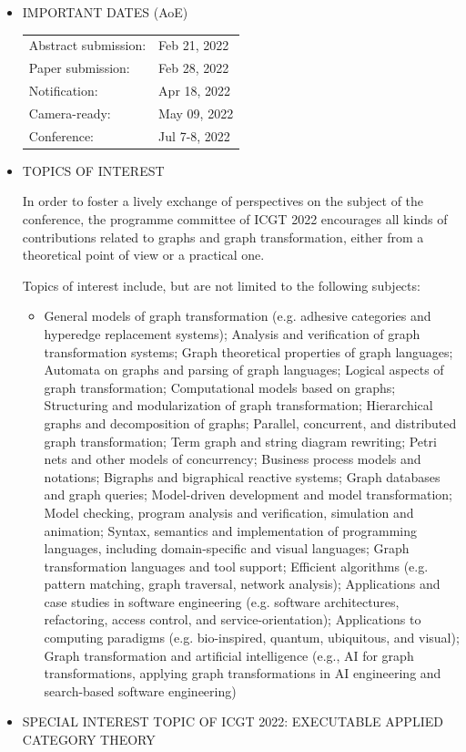 \documentclass[prodmode,acmtecs]{acmsmall} %
\begin{document}
\begin{itemize}
\item  IMPORTANT DATES (AoE) 
 
\begin{tabulary}{\linewidth}{LL}Abstract submission:  & Feb 21, 2022 \\
Paper submission:  & Feb 28, 2022 \\
Notification:  & Apr 18, 2022 \\
Camera-ready:  & May 09, 2022 \\
Conference:  & Jul 7-8, 2022 \\
\end{tabulary}
 
\item  TOPICS OF INTEREST 
 
  In order to foster a lively exchange of perspectives on the subject of the conference, the programme committee of ICGT 2022 encourages all kinds of contributions related to graphs and graph transformation, either from a theoretical point of view or a practical one. 
 
  Topics of interest include, but are not limited to the following subjects: 
 
\begin{itemize}\item  General models of graph transformation (e.g. adhesive categories and hyperedge replacement systems); Analysis and verification of graph transformation systems; Graph theoretical properties of graph languages; Automata on graphs and parsing of graph languages; Logical aspects of graph transformation; Computational models based on graphs; Structuring and modularization of graph transformation; Hierarchical graphs and decomposition of graphs; Parallel, concurrent, and distributed graph transformation; Term graph and string diagram rewriting; Petri nets and other models of concurrency; Business process models and notations; Bigraphs and bigraphical reactive systems; Graph databases and graph queries; Model-driven development and model transformation; Model checking, program analysis and verification, simulation and animation; Syntax, semantics and implementation of programming languages, including domain-specific and visual languages; Graph transformation languages and tool support; Efficient algorithms (e.g. pattern matching, graph traversal, network analysis); Applications and case studies in software engineering (e.g. software architectures, refactoring, access control, and service-orientation); Applications to computing paradigms (e.g. bio-inspired, quantum, ubiquitous, and visual); Graph transformation and artificial intelligence (e.g., AI for graph transformations, applying graph transformations in AI engineering and search-based software engineering)
\end{itemize} 
\item  SPECIAL INTEREST TOPIC OF ICGT 2022: EXECUTABLE APPLIED CATEGORY THEORY 
 

\end{itemize}
\end{document}
